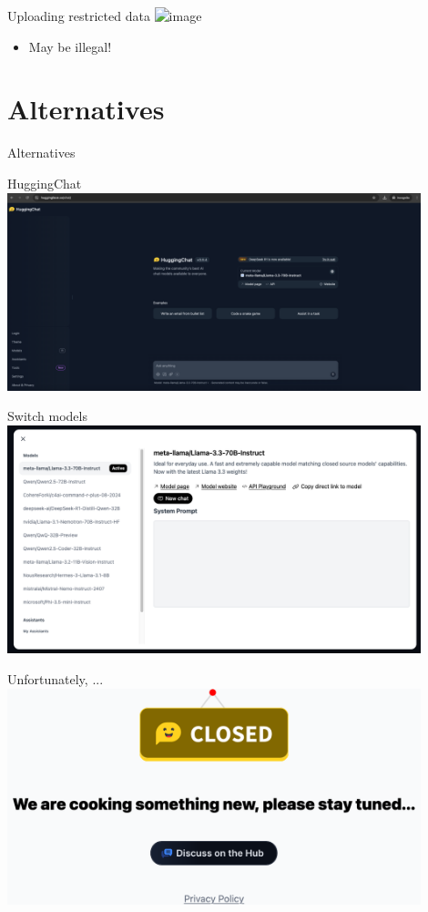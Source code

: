 \documentclass[t,xcolor={dvipsnames},final,aspectratio=169]{beamer}
\begin{document}
\begin{frame}{Uploading restricted data}
\includegraphics<+->[width=8cm]{img/llmdata.png}
\begin{itemize}
\item May be illegal!
\end{itemize}
\end{frame}

\section{Alternatives}

\begin{frame}{}
\huge{Alternatives}
\end{frame}

{
\begin{frame}{HuggingChat}
\includegraphics[width=0.9\textwidth]{img/huggingchat.png}
\end{frame}
}

\begin{frame}{Switch models}
\includegraphics[width=0.9\textwidth]{img/models.png}
\end{frame}

{
\begin{frame}{Unfortunately, ...}
\includegraphics[width=0.9\textwidth]{img/huggingchat_closed.png}
\end{frame}
}
\end{document}
